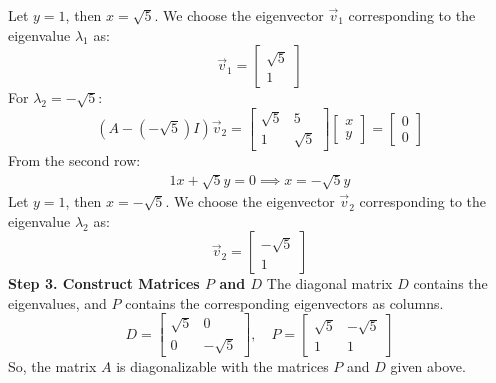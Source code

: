 \documentclass{article}
\begin{document}
Let $y=1$, then $x=\sqrt{5}$. We choose the eigenvector $\vec{v}_{1}$
corresponding to the eigenvalue $\lambda_{1}$ as:
\[
	\vec{v}_{1} = \begin{bmatrix} \sqrt{5} \\ 1 \end{bmatrix}
\]
For $\lambda_{2} = -\sqrt{5}$:
\[
	(A - (-\sqrt{5})I)\vec{v}_{2} = \begin{bmatrix} \sqrt{5} & 5 \\ 1 & \sqrt{5} \end{bmatrix} \begin{bmatrix} x \\ y \end{bmatrix} = \begin{bmatrix} 0 \\ 0 \end{bmatrix}
\]
From the second row:
\begin{align*}
	1x + \sqrt{5}y = 0 \implies x = -\sqrt{5}y
\end{align*}
Let $y=1$, then $x=-\sqrt{5}$. We choose the eigenvector $\vec{v}_{2}$
corresponding to the eigenvalue $\lambda_{2}$ as:
\[
	\vec{v}_{2} = \begin{bmatrix} -\sqrt{5} \\ 1 \end{bmatrix}
\]
\textbf{Step 3. Construct Matrices $P$ and $D$}
The diagonal matrix $D$ contains the eigenvalues, and $P$ contains the corresponding eigenvectors as columns.
\[
	D = \begin{bmatrix} \sqrt{5} & 0 \\ 0 & -\sqrt{5} \end{bmatrix}, \quad
	P = \begin{bmatrix} \sqrt{5} & -\sqrt{5} \\ 1 & 1 \end{bmatrix}
\]
So, the matrix $A$ is diagonalizable with the matrices $P$ and $D$ given above.

\pagebreak

\end{document}
